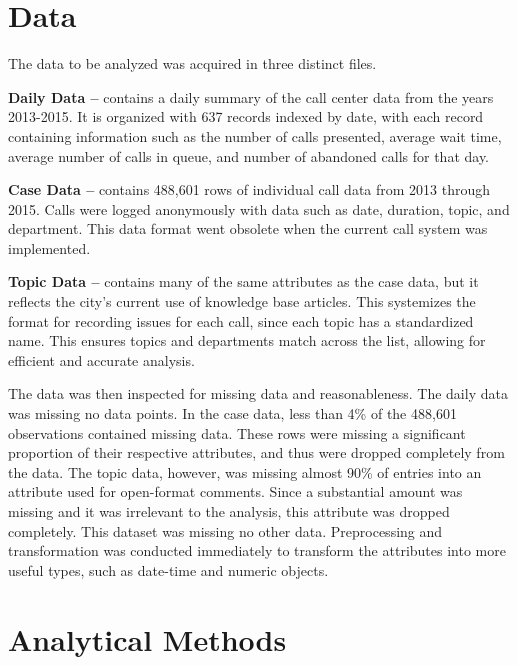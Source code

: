 \documentclass{article}
\begin{document}
\section{Data}

The data to be analyzed was acquired in three distinct files.
\par
\textbf{Daily Data --} contains a daily summary of the call center data from the years 2013-2015.  It is organized with 637 records indexed by date, with each record containing information such as the number of calls presented, average wait time, average number of calls in queue, and number of abandoned calls for that day.
\par
\textbf{Case Data --} contains 488,601 rows of individual call data from 2013 through 2015.  Calls were logged anonymously with data such as date, duration, topic, and department.  This data format went obsolete when the current call system was implemented.
\par
\textbf{Topic Data --} contains many of the same attributes as the case data, but it reflects the city's current use of knowledge base articles.  This systemizes the format for recording issues for each call, since each topic has a standardized name.  This ensures topics and departments match across the list, allowing for efficient and accurate analysis.
\par
The data was then inspected for missing data and reasonableness.  The daily data was missing no data points.  In the case data, less than 4\% of the 488,601 observations contained missing data.  These rows were missing a significant proportion of their respective attributes, and thus were dropped completely from the data.  The topic data, however, was missing almost 90\% of entries into an attribute used for open-format comments.  Since a substantial amount was missing and it was irrelevant to the analysis, this attribute was dropped completely.  This dataset was missing no other data.  Preprocessing and transformation was conducted immediately to transform the attributes into more useful types, such as date-time and numeric objects.

\section{Analytical Methods}
\end{document}
